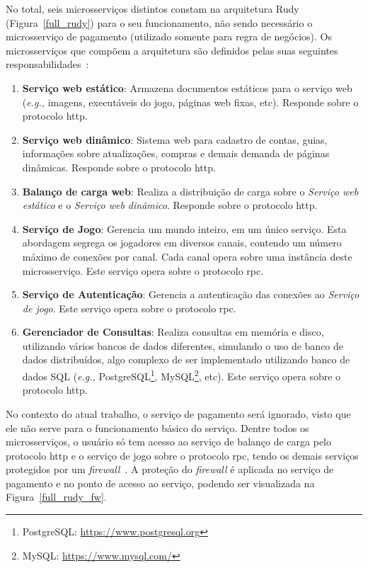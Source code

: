 No total, seis microsserviços distintos constam na arquitetura Rudy (Figura~\ref{full_rudy}) para o seu funcionamento, não sendo necessário o microsserviço de pagamento (utilizado somente para regra de negócios).
%
Os microsserviços que compõem a arquitetura são definidos pelas suas seguintes responsabilidades~\cite{matthiasrudy2011}:

\begin{enumerate}
  \item \textbf{Serviço web estático}: Armazena documentos estáticos para o serviço web (\textit{e.g., }imagens, executáveis do jogo, páginas web fixas, etc). Responde sobre o protocolo \ac{http}.
  \item \textbf{Serviço web dinâmico}: Sistema web para cadastro de contas, guias, informações sobre atualizações, compras e demais demanda de páginas dinâmicas. Responde sobre o protocolo \ac{http}.
  \item \textbf{Balanço de carga web}: Realiza a distribuição de carga sobre o \textit{Serviço web estático} e o \textit{Serviço web dinâmico}. Responde sobre o protocolo \ac{http}.
  \item \textbf{Serviço de Jogo}: Gerencia um mundo inteiro, em um único serviço. Esta abordagem segrega os jogadores em diversos canais, contendo um número máximo de conexões por canal. Cada canal opera sobre uma instância deste microsserviço. Este serviço opera sobre o protocolo \ac{rpc}.
  \item \textbf{Serviço de Autenticação}: Gerencia a autenticação das conexões ao \textit{Serviço de jogo}. Este serviço opera sobre o protocolo \ac{rpc}.
  \item \textbf{Gerenciador de Consultas}: Realiza consultas em memória e disco, utilizando vários bancos de dados diferentes, simulando o uso de banco de dados distribuídos, algo complexo de ser implementado utilizando banco de dados SQL (\textit{e.g.,} PostgreSQL\footnote{PostgreSQL: \url{https://www.postgresql.org}}, MySQL\footnote{MySQL: \url{https://www.mysql.com/}}, etc). Este serviço opera sobre o protocolo \ac{http}.
\end{enumerate}


No contexto do atual trabalho, o serviço de pagamento será ignorado, visto que ele não serve para o funcionamento básico do serviço.
%
Dentre todos os microsserviços, o usuário só tem acesso ao serviço de balanço de carga pelo protocolo \ac{http} e o serviço de jogo sobre o protocolo \ac{rpc}, tendo os demais serviços protegidos por um \textit{firewall}~\cite{matthiasrudy2011}.
%
A proteção do \textit{firewall} é aplicada no serviço de pagamento e no ponto de acesso ao serviço, podendo ser visualizada na Figura~\ref{full_rudy_fw}.


